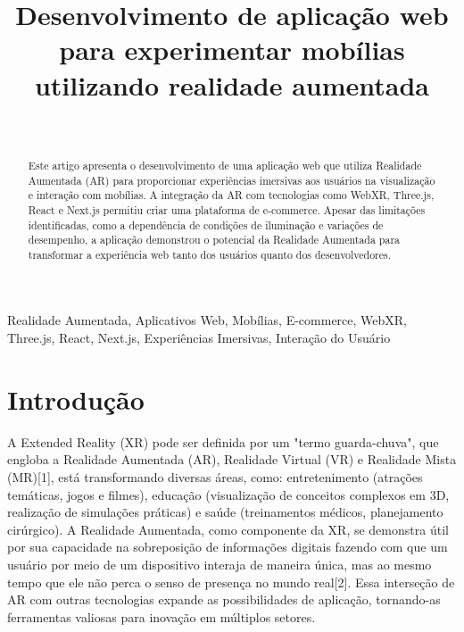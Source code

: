 \documentclass[conference]{IEEEtran}
\begin{document}
\title{Desenvolvimento de aplicação web para experimentar mobílias utilizando realidade aumentada\\
}

\author{
   \\

}

\maketitle

\begin{abstract}
  Este artigo apresenta o desenvolvimento de uma aplicação web que utiliza Realidade Aumentada (AR)
  para proporcionar experiências imersivas aos usuários na visualização e interação com mobílias.
  A integração da AR com tecnologias como WebXR, Three.js, React e Next.js
  permitiu criar uma plataforma de e-commerce. Apesar das limitações identificadas,
  como a dependência de condições de iluminação e variações de desempenho,
  a aplicação demonstrou o potencial da Realidade Aumentada para transformar a experiência web tanto dos usuários quanto dos desenvolvedores.
\end{abstract}

\begin{IEEEkeywords}
  Realidade Aumentada,
  Aplicativos Web,
  Mobílias,
  E-commerce,
  WebXR,
  Three.js,
  React,
  Next.js,
  Experiências Imersivas,
  Interação do Usuário
\end{IEEEkeywords}

\section{Introdução}
A Extended Reality (XR) pode ser definida por um "termo guarda-chuva", que
engloba a Realidade Aumentada (AR), Realidade Virtual (VR) e Realidade Mista
(MR)[1], está transformando diversas áreas, como: entretenimento (atrações
temáticas, jogos e filmes), educação (visualização de conceitos complexos em
3D, realização de simulações práticas) e saúde (treinamentos médicos,
planejamento cirúrgico). A Realidade Aumentada, como componente da XR, se
demonstra útil por sua capacidade na sobreposição de informações digitais
fazendo com que um usuário por meio de um dispositivo interaja de maneira
única, mas ao mesmo tempo que ele não perca o senso de presença no mundo
real[2]. Essa interseção de AR com outras tecnologias expande as possibilidades
de aplicação, tornando-as ferramentas valiosas para inovação em múltiplos
setores.
\end{document}
